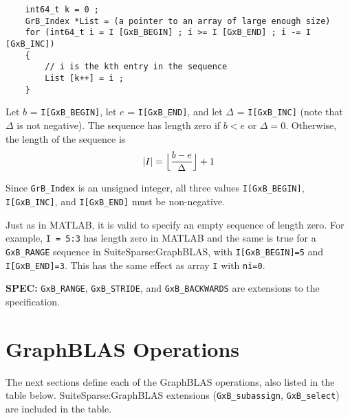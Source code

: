 \documentclass[12pt]{article}
\begin{document}
\begin{enumerate}
    \vspace{-0.1in}
    {\footnotesize
    \begin{verbatim}
    int64_t k = 0 ;
    GrB_Index *List = (a pointer to an array of large enough size)
    for (int64_t i = I [GxB_BEGIN] ; i >= I [GxB_END] ; i -= I [GxB_INC])
    {
        // i is the kth entry in the sequence
        List [k++] = i ;
    } \end{verbatim}}

    \vspace{-0.1in}
    Let $b$ = \verb'I[GxB_BEGIN]', let $e$ = \verb'I[GxB_END]', and let
    $\Delta$ = \verb'I[GxB_INC]' (note that $\Delta$ is not negative).  The
    sequence has length zero if $b < e$ or $\Delta=0$.  Otherwise, the length
    of the sequence is
    \[
    |I| = \Bigl\lfloor\dfrac{b-e}{\Delta}\Bigr\rfloor + 1
    \]

\end{enumerate}

Since \verb'GrB_Index' is an unsigned integer, all three values
\verb'I[GxB_BEGIN]', \verb'I[GxB_INC]', and \verb'I[GxB_END]' must
be non-negative.

Just as in MATLAB, it is valid to specify an empty sequence of length zero.
For example, \verb'I = 5:3' has length zero in MATLAB and the same is
true for a \verb'GxB_RANGE' sequence in SuiteSparse:GraphBLAS, with
\verb'I[GxB_BEGIN]=5' and \verb'I[GxB_END]=3'.  This has the same
effect as array \verb'I' with \verb'ni=0'.

\begin{spec}
{\bf SPEC:} \verb'GxB_RANGE', \verb'GxB_STRIDE', and \verb'GxB_BACKWARDS'
are extensions to the specification.
\end{spec}

\section{GraphBLAS Operations} %
\label{operations}

The next sections define each of the GraphBLAS operations, also listed in the
table below.  SuiteSparse:GraphBLAS extensions (\verb'GxB_subassign',
\verb'GxB_select') are included in the table.
\end{document}
